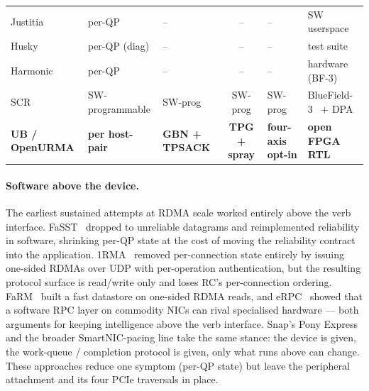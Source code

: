 \documentclass[10pt,twocolumn]{article}
\begin{document}
\begin{table}[t]
\begin{tabular}{l l l c l l}
\midrule
Justitia~\cite{zhang2022:justitia}       & per-QP            & --               & --           & --              & SW userspace \\
Husky~\cite{kong2023:husky}              & per-QP (diag)     & --               & --           & --              & test suite \\
Harmonic~\cite{lou2024:harmonic}         & per-QP            & --               & --           & --              & hardware (BF-3) \\
SCR~\cite{zhao2025:scr}                  & SW-programmable   & SW-prog          & SW-prog      & SW-prog         & BlueField-3~\cite{nvidia:bluefield-3} + DPA \\
\midrule
\textbf{UB / OpenURMA}                   & \textbf{per host-pair} & \textbf{GBN + TPSACK} & \textbf{TPG + spray} & \textbf{four-axis opt-in} & \textbf{open FPGA RTL} \\
\bottomrule
\end{tabular}
\end{table}

\paragraph{Software above the device.}
The earliest sustained attempts at RDMA scale worked entirely
above the verb interface. FaSST~\cite{kalia:fasst-extended} dropped to
unreliable datagrams and reimplemented reliability in software,
shrinking per-QP state at the cost of moving the reliability
contract into the application. 1RMA~\cite{singhvi2020:1rma}
removed per-connection state entirely by issuing one-sided RDMAs
over UDP with per-operation authentication, but the resulting
protocol surface is read/write only and loses RC's per-connection
ordering. FaRM~\cite{dragojevic2014:farm} built a fast
datastore on one-sided RDMA reads, and eRPC~\cite{kalia2019:erpc}
showed that a software RPC layer on commodity NICs can rival
specialised hardware --- both arguments for keeping intelligence
above the verb interface. Snap's Pony Express~\cite{marty2019:snap}
and the broader SmartNIC-pacing line take the same stance: the
device is given, the work-queue / completion protocol is given,
only what runs above can change. These approaches reduce one
symptom (per-QP state) but leave the peripheral attachment and its
four PCIe traversals in place.
\end{document}
